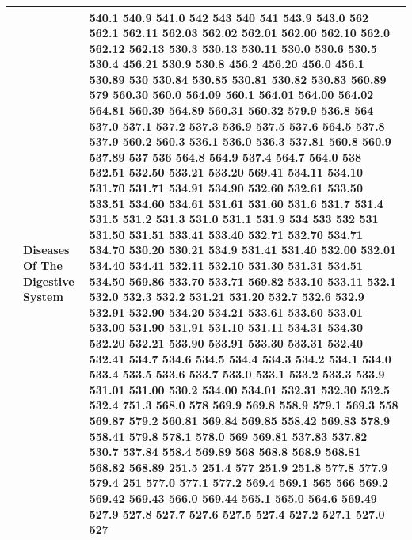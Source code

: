 \documentclass[3p,super,numbers,sort&compress,preprint,10pt]{elsarticle}
\begin{document}
\begin{longtable}{|L{.1in}|L{.6in}||L{5.65in}|}
    & Diseases Of The Digestive System &  540.1 540.9 541.0 542 543 540 541 543.9 543.0 562 562.1 562.11 562.03 562.02 562.01 562.00 562.10 562.0 562.12 562.13 530.3 530.13 530.11 530.0 530.6 530.5 530.4 456.21 530.9 530.8 456.2 456.20 456.0 456.1 530.89 530 530.84 530.85 530.81 530.82 530.83 560.89 579 560.30 560.0 564.09 560.1 564.01 564.00 564.02 564.81 560.39 564.89 560.31 560.32 579.9 536.8 564 537.0 537.1 537.2 537.3 536.9 537.5 537.6 564.5 537.8 537.9 560.2 560.3 536.1 536.0 536.3 537.81 560.8 560.9 537.89 537 536 564.8 564.9 537.4 564.7 564.0 538 532.51 532.50 533.21 533.20 569.41 534.11 534.10 531.70 531.71 534.91 534.90 532.60 532.61 533.50 533.51 534.60 534.61 531.61 531.60 531.6 531.7 531.4 531.5 531.2 531.3 531.0 531.1 531.9 534 533 532 531 531.50 531.51 533.41 533.40 532.71 532.70 534.71 534.70 530.20 530.21 534.9 531.41 531.40 532.00 532.01 534.40 534.41 532.11 532.10 531.30 531.31 534.51 534.50 569.86 533.70 533.71 569.82 533.10 533.11 532.1 532.0 532.3 532.2 531.21 531.20 532.7 532.6 532.9 532.91 532.90 534.20 534.21 533.61 533.60 533.01 533.00 531.90 531.91 531.10 531.11 534.31 534.30 532.20 532.21 533.90 533.91 533.30 533.31 532.40 532.41 534.7 534.6 534.5 534.4 534.3 534.2 534.1 534.0 533.4 533.5 533.6 533.7 533.0 533.1 533.2 533.3 533.9 531.01 531.00 530.2 534.00 534.01 532.31 532.30 532.5 532.4 751.3 568.0 578 569.9 569.8 558.9 579.1 569.3 558 569.87 579.2 560.81 569.84 569.85 558.42 569.83 578.9 558.41 579.8 578.1 578.0 569 569.81 537.83 537.82 530.7 537.84 558.4 569.89 568 568.8 568.9 568.81 568.82 568.89 251.5 251.4 577 251.9 251.8 577.8 577.9 579.4 251 577.0 577.1 577.2 569.4 569.1 565 566 569.2 569.42 569.43 566.0 569.44 565.1 565.0 564.6 569.49 527.9 527.8 527.7 527.6 527.5 527.4 527.2 527.1 527.0 527\\\hline

\end{longtable}
\end{document}
